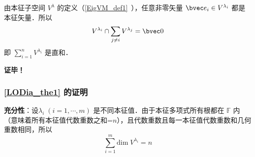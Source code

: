 由本征子空间 $V^\lambda$ 的定义（\autoref{EigVM_def1}~），任意非零矢量 $\bvec e_i\in V^{\lambda _i}$ 都是本征矢量．所以
\begin{equation}
V^{\lambda_i}\cap\sum_{j\neq i}V^{\lambda_j}=\bvec 0
\end{equation}
即  $\sum\limits_{i=1}^nV^{\lambda_i}$ 是直和．

\textbf{证毕！}
\subsubsection{\autoref{LODia_the1} 的证明}
\textbf{充分性}：设$\lambda_i\;(i=1,\cdots, m)$ 是不同本征值．由于本征多项式所有根都在 $\mathbb{F}$ 内（意味着所有本征值代数重数之和=$n$），且代数重数且每一本征值代数重数和几何重数相同，所以
\begin{equation}
\sum_{i=1}^m \mathrm{dim}\;V^{\lambda_i}=n
\end{equation}
